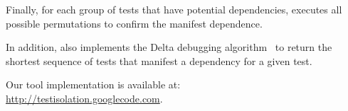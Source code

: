 Finally, for each group of tests that have potential
dependencies, \ourtool executes all possible permutations
to confirm the manifest dependence. 




In addition, \ourtool also implements the Delta debugging algorithm~\cite{Zeller:2002}
to return the shortest sequence of tests that manifest a dependency
for a given test.

Our tool implementation is available at: \\\url{http://testisolation.googlecode.com}.









